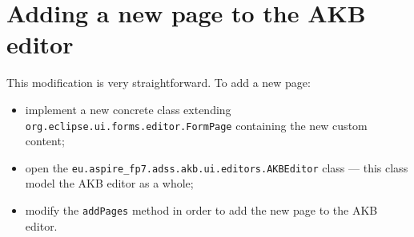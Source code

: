 \documentclass{memoir}
\newcommand{\Method}[1]{\texttt{#1}}
\newcommand{\Class}[1]{\texttt{#1}}
\begin{document}
	\section{Adding a new page to the AKB editor}
	
	This modification is very straightforward. To add a new page:
	
	\begin{itemize}
		\item implement a new concrete class extending \Class{org.eclipse.ui.forms.editor.FormPage} containing the new custom content;
		\item open the \Class{eu.aspire\_fp7.adss.akb.ui.editors.AKBEditor} class --- this class model the AKB editor as a whole;
		\item modify the \Method{addPages} method in order to add the new page to the AKB editor.
	\end{itemize}

%	
%	
%	
%	
%	
%
\end{document}
